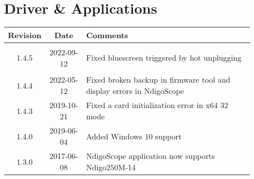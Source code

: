\section{Driver \& Applications}
\begin{tabularx}{\textwidth}{|c|c|X|}
    \hline
    Revision & Date & Comments\\
    \hline\hline
    \hypertarget{drvrev}{1.4.5} & 2022-09-12 & Fixed bluescreen triggered by hot unplugging\\
    \hline
    1.4.4 & 2022-05-12 & Fixed broken backup in firmware tool and display errors in NdigoScope\\
    \hline
    1.4.3 & 2019-10-21 & Fixed a card initialization error in x64 32 mode\\
    \hline
    1.4.0 & 2019-06-04 & Added Windows 10 support\\
    \hline
    1.3.0 & 2017-06-08 & NdigoScope application now supports Ndigo250M-14\\
    \hline
\end{tabularx}